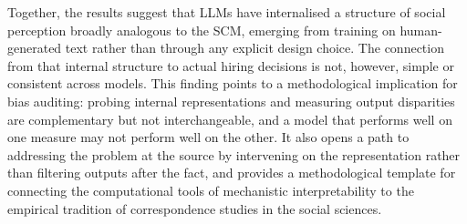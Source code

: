 \documentclass[twocolumn]{article}
\begin{document}
Together, the results suggest that LLMs have internalised a structure of
social perception broadly analogous to the SCM, emerging from training on
human-generated text rather than through any explicit design choice.
The connection from that internal structure to actual hiring decisions is
not, however, simple or consistent across models.
This finding points to a methodological implication for bias auditing:
probing internal representations and measuring output disparities are
complementary but not interchangeable, and a model that performs well on
one measure may not perform well on the other.
It also opens a path to addressing the problem at the source by
intervening on the representation rather than filtering outputs after
the fact, and provides a methodological template for connecting the
computational tools of mechanistic interpretability to the empirical
tradition of correspondence studies in the social sciences.
\end{document}
